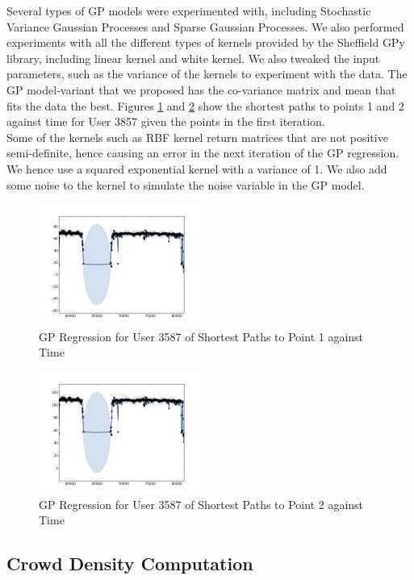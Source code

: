 \documentclass[letterpaper]{article}
\begin{document}
Several types of GP models were experimented with, including Stochastic Variance Gaussian Processes and Sparse Gaussian Processes. We also performed experiments with all the different types of kernels provided by the Sheffield GPy library, including linear kernel and white kernel. We also tweaked the input parameters, such as the variance of the kernels to experiment with the data. The GP model-variant that we proposed has the co-variance matrix and mean that fits the data the best. Figures \ref{fig:path1} and \ref{fig:path2} show the shortest paths to points 1 and 2 against time for User 3857 given the points in the first iteration. \\

Some of the kernels such as RBF kernel return matrices that are not positive semi-definite, hence causing an error in the next iteration of the GP regression. We hence use a squared exponential kernel with a variance of 1. We also add some noise to the kernel to simulate the noise variable in the GP model.

\begin{figure}[!h]
  \centering
    \includegraphics[width=200px]{diagrams/3587-path1.png}
  \caption{GP Regression for User 3587 of Shortest Paths to Point 1 against Time}
  \label{fig:path1}
\end{figure}

\begin{figure}[!h]
  \centering
    \includegraphics[width=200px]{diagrams/3587-path2.png}
  \caption{GP Regression for User 3587 of Shortest Paths to Point 2 against Time}
  \label{fig:path2}
\end{figure}

\subsection{Crowd Density Computation}
\end{document}
